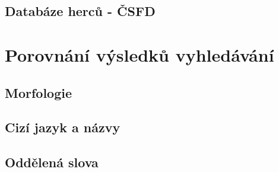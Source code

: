 \documentclass[12pt,letterpaper,oneside,openright]{book}
\begin{document}
%


\subsection{Databáze herců - ČSFD}

\section{Porovnání výsledků vyhledávání}
\subsection{Morfologie}
\subsection{Cizí jazyk a názvy}
\subsection{Oddělená slova}
\end{document}
